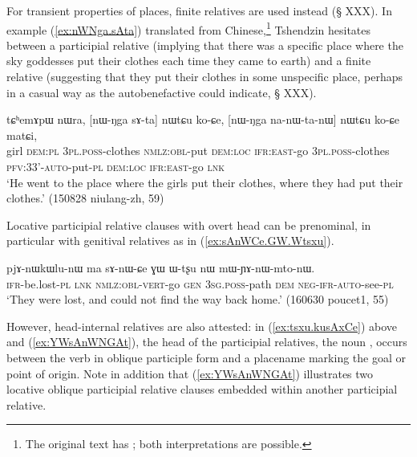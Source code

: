 For transient properties of places, finite relatives are used instead (§ XXX). In example (\ref{ex:nWNga.sAta}) translated from Chinese,\footnote{The original text has ; both interpretations are possible. }  Tshendzin hesitates between a participial relative (implying that there was a specific place where the sky goddesses put their clothes each time they came to earth) and a finite relative (suggesting that they put their clothes in some unspecific place, perhaps in a casual way as the autobenefactive  could indicate, § XXX).

\begin{exe}
\ex \label{ex:nWNga.sAta}
\gll tɕʰemɤpɯ nɯra, [nɯ-ŋga sɤ-ta] nɯtɕu ko-ɕe, [nɯ-ŋga na-nɯ-ta-nɯ] nɯtɕu ko-ɕe matɕi, \\
girl \textsc{dem}:\textsc{pl} \textsc{3pl}.\textsc{poss}-clothes \textsc{nmlz}:\textsc{obl}-put \textsc{dem}:\textsc{loc} \textsc{ifr}:\textsc{east}-go \textsc{3pl}.\textsc{poss}-clothes \textsc{pfv}:3\fl{}3'-\textsc{auto}-put-\textsc{pl} \textsc{dem}:\textsc{loc} \textsc{ifr}:\textsc{east}-go \textsc{lnk} \\
\glt `He went to the place where the girls put their clothes, where they had put their clothes.' (150828 niulang-zh, 59)
\end{exe}

Locative participial relative clauses with overt head can be prenominal, in particular with genitival relatives as in (\ref{ex:sAnWCe.GW.Wtsxu}). 

\begin{exe}
\ex \label{ex:sAnWCe.GW.Wtsxu}
\gll  pjɤ-nɯkɯlu-nɯ ma sɤ-nɯ-ɕe ɣɯ ɯ-tʂu nɯ mɯ-ɲɤ-nɯ-mto-nɯ. \\
\textsc{ifr}-be.lost-\textsc{pl}  \textsc{lnk} \textsc{nmlz}:\textsc{obl}-\textsc{vert}-go \textsc{gen} \textsc{3sg}.\textsc{poss}-path \textsc{dem} \textsc{neg}-\textsc{ifr}-\textsc{auto}-see-\textsc{pl} \\
\glt `They were lost, and could not find the way back home.' (160630 poucet1, 55)
\end{exe}

However, head-internal relatives are also attested: in (\ref{ex:tsxu.kusAxCe}) above and (\ref{ex:YWsAnWNGAt}), the head of the participial relatives, the noun , occurs between the verb in oblique participle form and a placename marking the goal or point of origin. Note in addition that (\ref{ex:YWsAnWNGAt}) illustrates two locative oblique participial relative clauses embedded within another participial relative.

